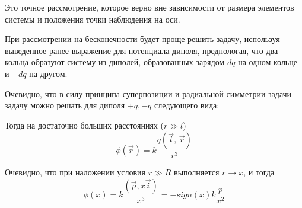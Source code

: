 \documentclass[a4paper,14pt]{extarticle}
\begin{document}
Это точное рассмотрение, которое верно вне зависимости от размера элементов системы и положения точки наблюдения на оси.

При рассмотрении на бесконечности будет проще решить задачу, используя выведенное ранее выражение для потенциала диполя, предпологая, что два кольца образуют систему из диполей, образованных зарядом $dq$ на одном кольце и $-dq$ на другом. 

Очевидно, что в силу принципа суперпозиции и радиальной симметрии задачи задачу можно решать для диполя ${+q,-q}$ следующего вида:

\begin{figure}[H]
    \centering
\end{figure}

Тогда на достаточно больших расстояниях ($r\gg l $)
\begin{equation}
	\phi(\vec{r})=k\frac{q(\vec{l},\,\vec{r})}{r^3}
\end{equation}

Очевидно, что при наложении условия $r \gg R$ выполняется $r\to x$, и тогда 
\begin{equation}
	\phi(x)=k\frac{(\vec{p},x\vec{i})}{x^3}=-sign(x)k\frac{p}{x^2}
\end{equation}


	
\end{document}
